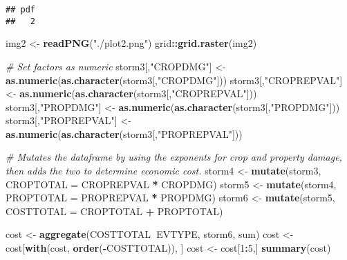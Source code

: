 \documentclass[]{article}
\newenvironment{Shaded}{\begin{snugshade}}{\end{snugshade}}
\newcommand{\KeywordTok}[1]{\textcolor[rgb]{0.13,0.29,0.53}{\textbf{#1}}}
\newcommand{\DataTypeTok}[1]{\textcolor[rgb]{0.13,0.29,0.53}{#1}}
\newcommand{\DecValTok}[1]{\textcolor[rgb]{0.00,0.00,0.81}{#1}}
\newcommand{\StringTok}[1]{\textcolor[rgb]{0.31,0.60,0.02}{#1}}
\newcommand{\CommentTok}[1]{\textcolor[rgb]{0.56,0.35,0.01}{\textit{#1}}}
\newcommand{\OperatorTok}[1]{\textcolor[rgb]{0.81,0.36,0.00}{\textbf{#1}}}
\newcommand{\NormalTok}[1]{#1}
\begin{document}
\begin{verbatim}
## pdf 
##   2
\end{verbatim}

\begin{Shaded}
\begin{Highlighting}[]
\NormalTok{  img2 <-}\StringTok{ }\KeywordTok{readPNG}\NormalTok{(}\StringTok{"./plot2.png"}\NormalTok{)}
\NormalTok{  grid}\OperatorTok{::}\KeywordTok{grid.raster}\NormalTok{(img2)}
  
\CommentTok{# Set factors as numeric  }
\NormalTok{storm3[,}\StringTok{"CROPDMG"}\NormalTok{] <-}\StringTok{ }\KeywordTok{as.numeric}\NormalTok{(}\KeywordTok{as.character}\NormalTok{(storm3[,}\StringTok{"CROPDMG"}\NormalTok{]))}
\NormalTok{storm3[,}\StringTok{"CROPREPVAL"}\NormalTok{] <-}\StringTok{ }\KeywordTok{as.numeric}\NormalTok{(}\KeywordTok{as.character}\NormalTok{(storm3[,}\StringTok{"CROPREPVAL"}\NormalTok{]))}
\NormalTok{storm3[,}\StringTok{"PROPDMG"}\NormalTok{] <-}\StringTok{ }\KeywordTok{as.numeric}\NormalTok{(}\KeywordTok{as.character}\NormalTok{(storm3[,}\StringTok{"PROPDMG"}\NormalTok{]))}
\NormalTok{storm3[,}\StringTok{"PROPREPVAL"}\NormalTok{] <-}\StringTok{ }\KeywordTok{as.numeric}\NormalTok{(}\KeywordTok{as.character}\NormalTok{(storm3[,}\StringTok{"PROPREPVAL"}\NormalTok{]))}

\CommentTok{# Mutates the dataframe by using the exponents for crop and property damage, then adds the two to determine economic cost. }
\NormalTok{storm4 <-}\StringTok{ }\KeywordTok{mutate}\NormalTok{(storm3, }\DataTypeTok{CROPTOTAL =}\NormalTok{ CROPREPVAL }\OperatorTok{*}\StringTok{ }\NormalTok{CROPDMG)}
\NormalTok{storm5 <-}\StringTok{ }\KeywordTok{mutate}\NormalTok{(storm4, }\DataTypeTok{PROPTOTAL =}\NormalTok{ PROPREPVAL }\OperatorTok{*}\StringTok{ }\NormalTok{PROPDMG)}
\NormalTok{storm6 <-}\StringTok{ }\KeywordTok{mutate}\NormalTok{(storm5, }\DataTypeTok{COSTTOTAL =}\NormalTok{ CROPTOTAL }\OperatorTok{+}\StringTok{ }\NormalTok{PROPTOTAL)}

\NormalTok{cost <-}\StringTok{ }\KeywordTok{aggregate}\NormalTok{(COSTTOTAL}\OperatorTok{~}\NormalTok{EVTYPE, storm6, sum)}
\NormalTok{cost <-}\StringTok{ }\NormalTok{cost[}\KeywordTok{with}\NormalTok{(cost, }\KeywordTok{order}\NormalTok{(}\OperatorTok{-}\NormalTok{COSTTOTAL)), ]}
\NormalTok{cost <-}\StringTok{ }\NormalTok{cost[}\DecValTok{1}\OperatorTok{:}\DecValTok{5}\NormalTok{,]}
\KeywordTok{summary}\NormalTok{(cost)}
\end{Highlighting}
\end{Shaded}
\end{document}
